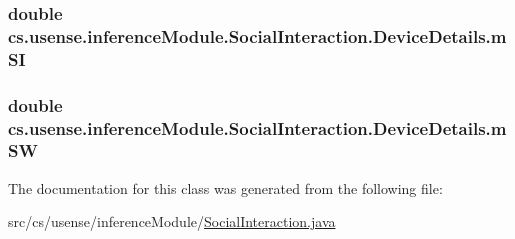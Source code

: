 \subsubsection[{m\+S\+I}]{\setlength{\rightskip}{0pt plus 5cm}double cs.\+usense.\+inference\+Module.\+Social\+Interaction.\+Device\+Details.\+m\+S\+I}\label{classcs_1_1usense_1_1inference_module_1_1_social_interaction_1_1_device_details_aa68957928663053fdafb3d1c2d4d0d3e}
\hypertarget{classcs_1_1usense_1_1inference_module_1_1_social_interaction_1_1_device_details_a4b17a12a8e1a57eb2eb44683f0832853}{}
\subsubsection[{m\+S\+W}]{\setlength{\rightskip}{0pt plus 5cm}double cs.\+usense.\+inference\+Module.\+Social\+Interaction.\+Device\+Details.\+m\+S\+W}\label{classcs_1_1usense_1_1inference_module_1_1_social_interaction_1_1_device_details_a4b17a12a8e1a57eb2eb44683f0832853}


The documentation for this class was generated from the following file\+:\begin{DoxyCompactItemize}
\item 
src/cs/usense/inference\+Module/\hyperlink{_social_interaction_8java}{Social\+Interaction.\+java}\end{DoxyCompactItemize}
